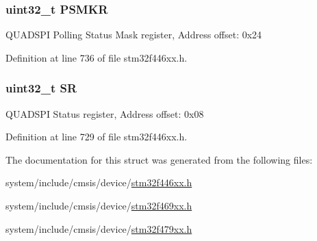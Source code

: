 \subsubsection[{\texorpdfstring{P\+S\+M\+KR}{PSMKR}}]{ uint32\+\_\+t P\+S\+M\+KR}\hypertarget{struct_q_u_a_d_s_p_i___type_def_a7327d5955c8e4e3eb689a7ad2a1fa219}{}\label{struct_q_u_a_d_s_p_i___type_def_a7327d5955c8e4e3eb689a7ad2a1fa219}
Q\+U\+A\+D\+S\+PI Polling Status Mask register, Address offset\+: 0x24 

Definition at line 736 of file stm32f446xx.\+h.

\subsubsection[{\texorpdfstring{SR}{SR}}]{ uint32\+\_\+t SR}\hypertarget{struct_q_u_a_d_s_p_i___type_def_af6aca2bbd40c0fb6df7c3aebe224a360}{}\label{struct_q_u_a_d_s_p_i___type_def_af6aca2bbd40c0fb6df7c3aebe224a360}
Q\+U\+A\+D\+S\+PI Status register, Address offset\+: 0x08 

Definition at line 729 of file stm32f446xx.\+h.



The documentation for this struct was generated from the following files\+:\begin{DoxyCompactItemize}
\item 
system/include/cmsis/device/\hyperlink{stm32f446xx_8h}{stm32f446xx.\+h}\item 
system/include/cmsis/device/\hyperlink{stm32f469xx_8h}{stm32f469xx.\+h}\item 
system/include/cmsis/device/\hyperlink{stm32f479xx_8h}{stm32f479xx.\+h}\end{DoxyCompactItemize}
